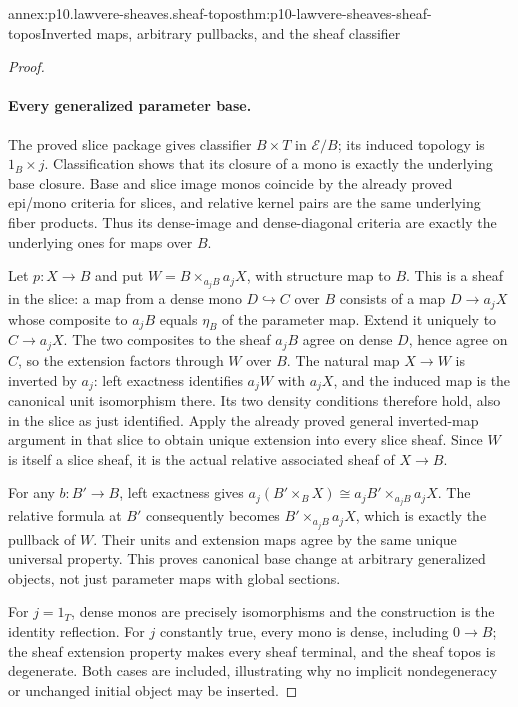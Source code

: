 \begin{annexitem}{annex:p10.lawvere-sheaves.sheaf-topos}{thm:p10-lawvere-sheaves-sheaf-topos}{Inverted maps, arbitrary pullbacks, and the sheaf classifier}
\begin{proof}
\paragraph{Every generalized parameter base.}
The proved slice package gives classifier \(B\times T\)
in \(\mathcal E/B\); its induced topology is
\(1_B\times j\).  Classification shows that its
closure of a mono is exactly the underlying base
closure.  Base and slice image monos coincide by
the already proved epi/mono criteria for slices,
and relative kernel pairs are the same underlying
fiber products.  Thus its dense-image and
dense-diagonal criteria are exactly the underlying
ones for maps over \(B\).

Let \(p:X\to B\) and put
\(W=B\times_{a_jB}a_jX\), with structure map to
\(B\).  This is a sheaf in the slice: a map
from a dense mono \(D\hookrightarrow C\) over
\(B\) consists of a map \(D\to a_jX\) whose
composite to \(a_jB\) equals \(\eta_B\) of
the parameter map.  Extend it uniquely to
\(C\to a_jX\).  The two composites to the
sheaf \(a_jB\) agree on dense \(D\), hence
agree on \(C\), so the extension factors
through \(W\) over \(B\).
The natural map \(X\to W\) is inverted by
\(a_j\): left exactness identifies \(a_jW\)
with \(a_jX\), and the induced map is the
canonical unit isomorphism there.  Its two
density conditions therefore hold, also in
the slice as just identified.  Apply the
already proved general inverted-map argument
in that slice to obtain unique extension into
every slice sheaf.  Since \(W\) is itself
a slice sheaf, it is the actual relative
associated sheaf of \(X\to B\).

For any \(b:B'\to B\), left exactness gives
\(a_j(B'\times_BX)\cong a_jB'\times_{a_jB}a_jX\).
The relative formula at \(B'\) consequently
becomes \(B'\times_{a_jB}a_jX\), which is
exactly the pullback of \(W\).  Their units
and extension maps agree by the same unique
universal property.  This proves canonical
base change at arbitrary generalized objects,
not just parameter maps with global sections.

For \(j=1_T\), dense monos are precisely
isomorphisms and the construction is the
identity reflection.  For \(j\) constantly
true, every mono is dense, including \(0\to B\);
the sheaf extension property makes every sheaf
terminal, and the sheaf topos is degenerate.
Both cases are included, illustrating why
no implicit nondegeneracy or unchanged initial
object may be inserted.
\end{proof}
\end{annexitem}

